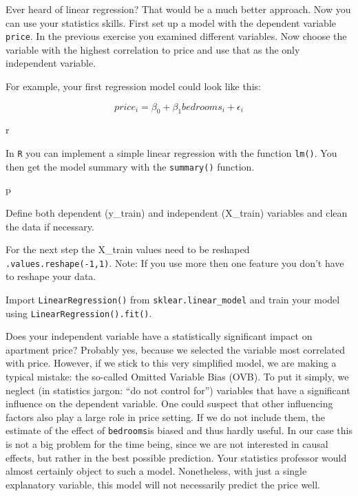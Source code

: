 \documentclass[
  11pt,
]{book}
\begin{document}
Ever heard of linear regression? That would be a much better approach.
Now you can use your statistics skills. First set up a model with the
dependent variable \texttt{price}. In the previous exercise you examined
different variables. Now choose the variable with the highest
correlation to price and use that as the only independent variable.

For example, your first regression model could look like this:

\[price_i = \beta_0 + \beta_1 bedrooms_i + \epsilon_i\]

\begin{tips}r

In \texttt{R} you can implement a simple linear regression with the
function \texttt{lm()}. You then get the model summary with the
\texttt{summary()} function.

\end{tips}

\begin{tipsp}p

Define both dependent (y\_train) and independent (X\_train) variables
and clean the data if necessary.

For the next step the X\_train values need to be reshaped
\texttt{.values.reshape(-1,1)}. Note: If you use more then one feature
you don't have to reshape your data.

Import \texttt{LinearRegression()} from \texttt{sklear.linear\_model}
and train your model using \texttt{LinearRegression().fit()}.

\end{tipsp}

Does your independent variable have a statistically significant impact
on apartment price? Probably yes, because we selected the variable most
correlated with price. However, if we stick to this very simplified
model, we are making a typical mistake: the so-called Omitted Variable
Bias (OVB). To put it simply, we neglect (in statistics jargon: ``do not
control for'') variables that have a significant influence on the
dependent variable. One could suspect that other influencing factors
also play a large role in price setting. If we do not include them, the
estimate of the effect of \texttt{bedrooms}is biased and thus hardly
useful. In our case this is not a big problem for the time being, since
we are not interested in causal effects, but rather in the best possible
prediction. Your statistics professor would almost certainly object to
such a model. Nonetheless, with just a single explanatory variable, this
model will not necessarily predict the price well.
\end{document}
